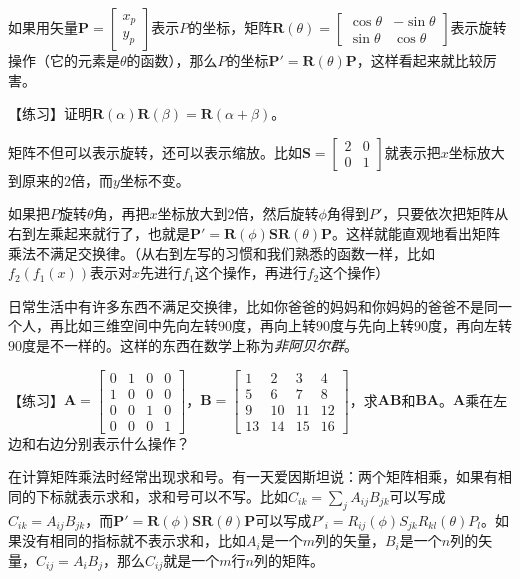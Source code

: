 如果用矢量$\mathbf{P}=\begin{bmatrix} x_p \\ y_p \end{bmatrix}$表示$P$的坐标，矩阵$\mathbf{R}(\theta)=\begin{bmatrix}
\cos \theta & -\sin \theta \\
\sin \theta & \cos \theta
\end{bmatrix}$表示旋转操作（它的元素是$\theta$的函数），那么$P$的坐标$\mathbf{P'}=\mathbf{R}(\theta) \mathbf{P}$，这样看起来就比较厉害。

【练习】证明$\mathbf{R}(\alpha) \mathbf{R}(\beta)=\mathbf{R}(\alpha+\beta)$。

矩阵不但可以表示旋转，还可以表示缩放。比如$\mathbf{S}=\begin{bmatrix}
2 & 0 \\
0 & 1
\end{bmatrix}$就表示把$x$坐标放大到原来的$2$倍，而$y$坐标不变。

如果把$P$旋转$\theta$角，再把$x$坐标放大到$2$倍，然后旋转$\phi$角得到$P'$，只要依次把矩阵从右到左乘起来就行了，也就是$\mathbf{P'}=\mathbf{R}(\phi) \mathbf{S} \mathbf{R}(\theta) \mathbf{P}$。这样就能直观地看出矩阵乘法不满足交换律。（从右到左写的习惯和我们熟悉的函数一样，比如$f_2(f_1(x))$表示对$x$先进行$f_1$这个操作，再进行$f_2$这个操作）

日常生活中有许多东西不满足交换律，比如你爸爸的妈妈和你妈妈的爸爸不是同一个人，再比如三维空间中先向左转$90$度，再向上转$90$度与先向上转$90$度，再向左转$90$度是不一样的。这样的东西在数学上称为\emph{非阿贝尔群}。

【练习】$\mathbf{A}=\begin{bmatrix}
0 & 1 & 0 & 0 \\
1 & 0 & 0 & 0 \\
0 & 0 & 1 & 0 \\
0 & 0 & 0 & 1
\end{bmatrix}$，$\mathbf{B}=\begin{bmatrix}
1 & 2 & 3 & 4 \\
5 & 6 & 7 & 8 \\
9 & 10 & 11 & 12 \\
13 & 14 & 15 & 16
\end{bmatrix}$，求$\mathbf{A} \mathbf{B}$和$\mathbf{B} \mathbf{A}$。$\mathbf{A}$乘在左边和右边分别表示什么操作？

在计算矩阵乘法时经常出现求和号。有一天爱因斯坦说：两个矩阵相乘，如果有相同的下标就表示求和，求和号可以不写。比如$C_{i k}=\sum_j A_{i j} B_{j k}$可以写成$C_{i k}=A_{i j} B_{j k}$，而$\mathbf{P'}=\mathbf{R}(\phi) \mathbf{S} \mathbf{R}(\theta) \mathbf{P}$可以写成$P'_i=R_{i j}(\phi) S_{j k} R_{k l}(\theta) P_l$。如果没有相同的指标就不表示求和，比如$A_i$是一个$m$列的矢量，$B_i$是一个$n$列的矢量，$C_{i j}=A_i B_j$，那么$C_{i j}$就是一个$m$行$n$列的矩阵。


